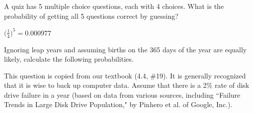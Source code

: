\documentclass[addpoints]{exam}
\begin{document}
\begin{questions}
\question A quiz has 5 multiple choice questions, each with 4 choices. What is the probability of getting all 5 questions correct by guessing?
\begin{solution}[1cm] $\displaystyle \bigg( \frac{1}{4} \bigg)^5=0.000977$ \end{solution}

\question Ignoring leap years and assuming births on the 365 days of the year are equally likely, calculate the following probabilities.

\question This question is copied from our textbook (4.4, \#19). It is generally recognized that it is wise to back up computer data. Assume that there is a 2\% rate of disk drive failure in a year (based on data from various sources, including ``Failure Trends in Large Disk Drive Population," by Pinhero et al. of Google, Inc.).
\end{questions}
\end{document}
